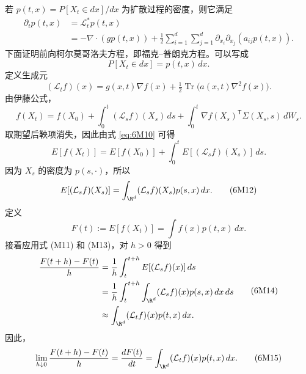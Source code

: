 若 $p(t,x)=P[X_t\in dx]/dx$ 为扩散过程的密度，则它满足
\begin{equation*}
  \begin{aligned}
  \partial_t p(t,x)&=\mathcal L_t^*p(t,x)\\
    &=-\nabla\cdot(gp(t,x))+
      \tfrac12\sum_{i=1}^d\sum_{j=1}^d\partial_{x_i}\partial_{x_j}(a_{ij}p(t,x)).
  \end{aligned}
  \tag{6M8}\label{eq:6M8}
\end{equation*}
下面证明前向柯尔莫哥洛夫方程，即福克–普朗克方程。可以写成
\begin{equation*}
  P[X_t\in dx]=p(t,x)\,dx.
  \tag{6M9}\label{eq:6M9}
\end{equation*}
定义生成元
\[
  (\mathcal L_t f)(x)=g(x,t)\nabla f(x)+
                   \tfrac12\operatorname{Tr}\bigl(a(x,t)\nabla^2f(x)\bigr).
\]
由伊藤公式，
\begin{equation*}
  f(X_t)=f(X_0)+\int_0^t(\mathcal L_s f)(X_s)\,ds
         +\int_0^t\nabla f(X_s)^{\mathsf T}\Sigma(X_s,s)\,dW_s.
  \tag{6M10}\label{eq:6M10}
\end{equation*}
取期望后鞅项消失，因此由式 \eqref{eq:6M10} 可得
\begin{equation*}
  E[f(X_t)]=E[f(X_0)]+\int_0^t E[(\mathcal L_s f)(X_s)]\,ds.
  \tag{6M11}\label{eq:6M11}
\end{equation*}
因为 $X_s$ 的密度为 $p(s,\cdot)$，所以
\begin{equation*}
  E[(\mathcal L_s f)(X_s)]=\int_{\R^d}(\mathcal L_s f)(X_s)p(s,x)\,dx.
  \tag{6M12}\label{eq:6M12}
\end{equation*}
定义
\begin{equation*}
  F(t):=E[f(X_t)]=\int f(x)p(t,x)\,dx.
  \tag{6M13}\label{eq:6M13}
\end{equation*}
接着应用式 (M11) 和 (M13)，对 $h>0$ 得到
\begin{equation*}
  \begin{aligned}
  \frac{F(t+h)-F(t)}{h}
    &=\frac1h\int_t^{t+h}E[(\mathcal L_sf)(x)]\,ds\\
    &=\frac1h\int_t^{t+h}\int_{\R^d}(\mathcal L_sf)(x)p(s,x)\,dx\,ds\\
    &\approx\int_{\R^d}(\mathcal L_t f)(x)p(t,x)\,dx.
  \end{aligned}
  \tag{6M14}\label{eq:6M14}
\end{equation*}
因此，
\begin{equation*}
  \lim_{h\downarrow0}\frac{F(t+h)-F(t)}{h}
    =\frac{dF(t)}{dt}=\int_{\R^d}(\mathcal L_tf)(x)p(t,x)\,dx.
  \tag{6M15}\label{eq:6M15}
\end{equation*}
